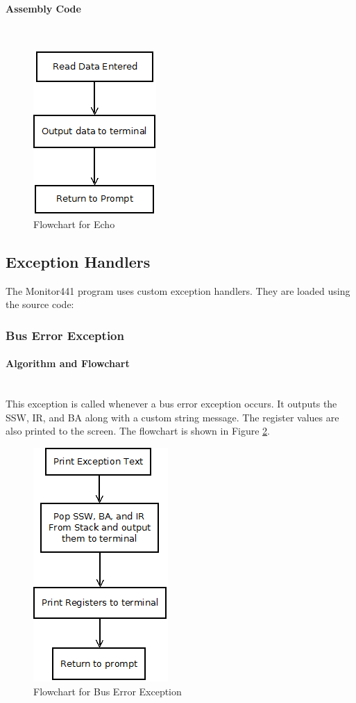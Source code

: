 \documentclass[12pt]{article}
\begin{document}
			\paragraph{Assembly Code}~\\				%
		
			
\begin{figure}[H]
\centering
\includegraphics[width=0.3\linewidth]{Echo}
\caption{Flowchart for Echo}
\label{fig:Echo}
\end{figure}
			
			\subsection{Exception Handlers}
			The Monitor441 program uses custom exception handlers. They are loaded using the source code:
			\subsubsection{Bus Error Exception}
			\paragraph{Algorithm and Flowchart}~\\
			
			This exception is called whenever a bus error exception occurs. It outputs the SSW, IR, and BA along with a custom string message. The register values are also printed to the screen. The flowchart is shown in Figure \ref{fig:BERR}.
			
			
\begin{figure}[H]
\centering
\includegraphics[width=0.3\linewidth]{BERR}
\caption{Flowchart for Bus Error Exception}
\label{fig:BERR}
\end{figure}
\end{document}
